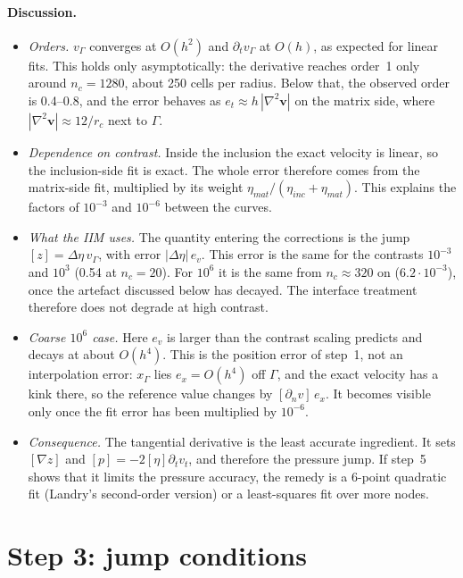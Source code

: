 \documentclass[11pt,a4paper]{article}
\begin{document}
\paragraph{Discussion.}
\begin{itemize}
  \item \emph{Orders.} $v_\Gamma$ converges at $O(h^2)$ and $\partial_t v_\Gamma$ at $O(h)$,
    as expected for linear fits. This holds only asymptotically: the derivative reaches order~1
    only around $n_c=1280$, about 250 cells per radius. Below that, the observed order is
    0.4--0.8, and the error behaves as $e_t\approx h\,|\nabla^2\mathbf v|$ on the matrix side,
    where $|\nabla^2\mathbf v|\approx12/r_c$ next to $\Gamma$.
  \item \emph{Dependence on contrast.} Inside the inclusion the exact velocity is linear, so the
    inclusion-side fit is exact. The whole error therefore comes from the matrix-side fit,
    multiplied by its weight $\eta_{mat}/(\eta_{inc}+\eta_{mat})$. This explains the factors of
    $10^{-3}$ and $10^{-6}$ between the curves.
  \item \emph{What the IIM uses.} The quantity entering the corrections is the jump
    $[z]=\Delta\eta\,v_\Gamma$, with error $|\Delta\eta|\,e_v$. This error is the same for the
    contrasts $10^{-3}$ and $10^3$ (0.54 at $n_c=20$). For $10^6$ it is the same from
    $n_c\approx320$ on ($6.2\cdot10^{-3}$), once the artefact discussed below has decayed. The
    interface treatment therefore does not degrade at high contrast.
  \item \emph{Coarse $10^6$ case.} Here $e_v$ is larger than the contrast scaling predicts and
    decays at about $O(h^4)$. This is the position error of step~1, not an interpolation error:
    $x_\Gamma$ lies $e_x=O(h^4)$ off $\Gamma$, and the exact velocity has a kink there, so the
    reference value changes by $[\partial_n v]\,e_x$. It becomes visible only once the fit
    error has been multiplied by $10^{-6}$.
  \item \emph{Consequence.} The tangential derivative is the least accurate ingredient. It sets
    $[\nabla z]$ and $[p]=-2[\eta]\partial_tv_t$, and therefore the pressure jump. If step~5
    shows that it limits the pressure accuracy, the remedy is a 6-point quadratic fit (Landry's
    second-order version) or a least-squares fit over more nodes.
\end{itemize}

\section{Step 3: jump conditions}\label{sec:s3}
\end{document}

